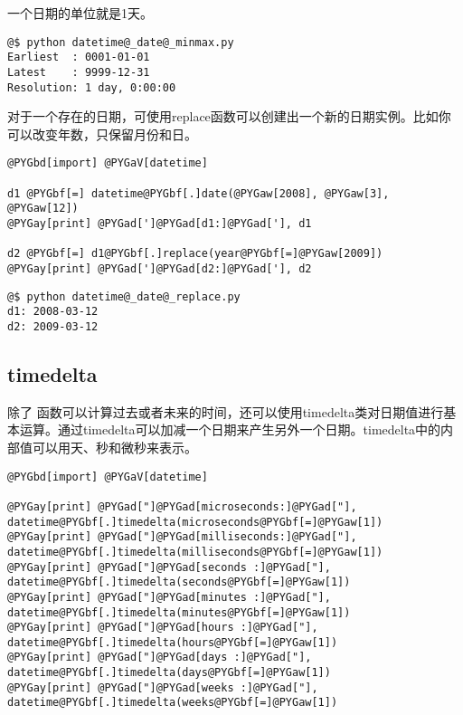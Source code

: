 \documentclass[letterpaper,10pt,english]{manual}
\begin{document}
一个日期的单位就是1天。

\begin{Verbatim}[commandchars=@\[\]]
@$ python datetime@_date@_minmax.py
Earliest  : 0001-01-01
Latest    : 9999-12-31
Resolution: 1 day, 0:00:00
\end{Verbatim}

对于一个存在的日期，可使用replace函数可以创建出一个新的日期实例。比如你可以改变年数，只保留月份和日。

\begin{Verbatim}[commandchars=@\[\]]
@PYGbd[import] @PYGaV[datetime]

d1 @PYGbf[=] datetime@PYGbf[.]date(@PYGaw[2008], @PYGaw[3], @PYGaw[12])
@PYGay[print] @PYGad[']@PYGad[d1:]@PYGad['], d1

d2 @PYGbf[=] d1@PYGbf[.]replace(year@PYGbf[=]@PYGaw[2009])
@PYGay[print] @PYGad[']@PYGad[d2:]@PYGad['], d2
\end{Verbatim}

\begin{Verbatim}[commandchars=@\[\]]
@$ python datetime@_date@_replace.py
d1: 2008-03-12
d2: 2009-03-12
\end{Verbatim}


\subsection{timedelta}

除了  函数可以计算过去或者未来的时间，还可以使用timedelta类对日期值进行基本运算。通过timedelta可以加减一个日期来产生另外一个日期。timedelta中的内部值可以用天、秒和微秒来表示。

\begin{Verbatim}[commandchars=@\[\]]
@PYGbd[import] @PYGaV[datetime]

@PYGay[print] @PYGad["]@PYGad[microseconds:]@PYGad["], datetime@PYGbf[.]timedelta(microseconds@PYGbf[=]@PYGaw[1])
@PYGay[print] @PYGad["]@PYGad[milliseconds:]@PYGad["], datetime@PYGbf[.]timedelta(milliseconds@PYGbf[=]@PYGaw[1])
@PYGay[print] @PYGad["]@PYGad[seconds :]@PYGad["], datetime@PYGbf[.]timedelta(seconds@PYGbf[=]@PYGaw[1])
@PYGay[print] @PYGad["]@PYGad[minutes :]@PYGad["], datetime@PYGbf[.]timedelta(minutes@PYGbf[=]@PYGaw[1])
@PYGay[print] @PYGad["]@PYGad[hours :]@PYGad["], datetime@PYGbf[.]timedelta(hours@PYGbf[=]@PYGaw[1])
@PYGay[print] @PYGad["]@PYGad[days :]@PYGad["], datetime@PYGbf[.]timedelta(days@PYGbf[=]@PYGaw[1])
@PYGay[print] @PYGad["]@PYGad[weeks :]@PYGad["], datetime@PYGbf[.]timedelta(weeks@PYGbf[=]@PYGaw[1])
\end{Verbatim}
\end{document}
